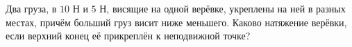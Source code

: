 Два груза, в $10$ Н и $5$ Н, висящие на одной верёвке, укреплены на ней
в разных местах, причём больший груз висит ниже меньшего. Каково
натяжение верёвки, если верхний конец её прикреплён к неподвижной точке?
